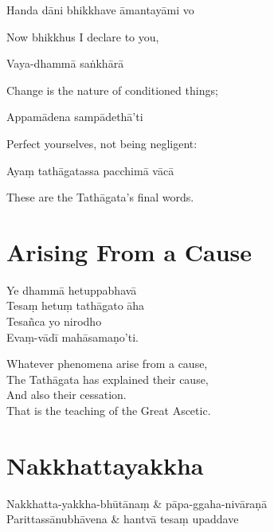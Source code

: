 
\begin{leader}
\end{leader}

Handa dāni bhikkhave āmantayāmi vo

\begin{english}
  Now bhikkhus I declare to you,
\end{english}

Vaya-dhammā saṅkhārā

\begin{english}
  Change is the nature of conditioned things;
\end{english}

Appamādena sampādethā'ti

\begin{english}
  Perfect yourselves, not being negligent:
\end{english}

Ayaṃ tathāgatassa pacchimā vācā

\begin{english}
  These are the Tathāgata's final words.
\end{english}


\section{Arising From a Cause}


\begin{paritta}
  Ye dhammā hetuppabhavā\\
  Tesaṃ hetuṃ tathāgato āha\\
  Tesañca yo nirodho\\
  Evaṃ-vādī mahāsamaṇo'ti.
\end{paritta}

\begin{english}
  Whatever phenomena arise from a cause,\\
  The Tathāgata has explained their cause,\\
  And also their cessation.\\
  That is the teaching of the Great Ascetic.
\end{english}


\section{Nakkhattayakkha}



\begin{twochants}
  Nakkhatta-yakkha-bhūtānaṃ & pāpa-ggaha-nivāraṇā\\
  Parittassānubhāvena & hantvā tesaṃ upaddave\\
\end{twochants}

